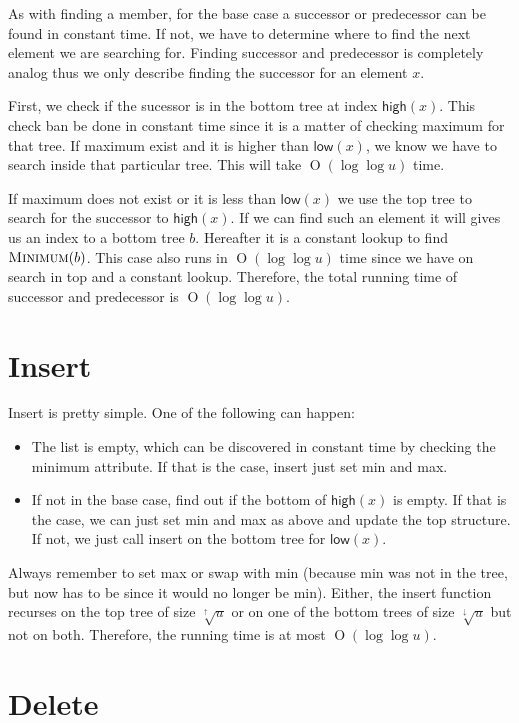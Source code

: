 \documentclass[oneside,11pt,openright]{report}
\newcommand{\BigO}[1]{\ensuremath{\operatorname{O}\left(#1\right)}}
\newcommand{\Minimum}{\textsc{Minimum}}
\newcommand{\HIGH}{\textsf{high}}
\newcommand{\LOW}{\textsf{low}}
\newcommand{\HIGHER}{\sqrt[\uparrow]{u}}
\newcommand{\LOWER}{\sqrt[\downarrow]{u}}
\begin{document}
As with finding a member, for the base case a successor or predecessor
can be found in  constant time. If not, we have  to determine where to
find  the next  element we  are searching  for. Finding  successor and
predecessor is  completely analog  thus we  only describe  finding the
successor for an element $x$.

First,  we check  if  the sucessor  is  in the  bottom  tree at  index
$\HIGH(x)$. This  check ban  be done  in constant time  since it  is a
matter of checking  maximum for that tree. If maximum  exist and it is
higher  than  $\LOW(x)$,  we  know  we  have  to  search  inside  that
particular tree. This will take $\BigO{\log\log u}$ time.

If maximum does not exist or it  is less than $\LOW(x)$ we use the top
tree to search for the successor to $\HIGH(x)$. If we can find such an
element it will gives  us an index to a bottom  tree $b$. Hereafter it
is a  constant lookup to  find $\Minimum(b)$.  This case also  runs in
$\BigO{\log\log u}$ time since we have on search in top and a constant
lookup. Therefore, the total running time of successor and predecessor
is $\BigO{\log\log u}$.

\section{Insert}

Insert is pretty simple. One of the following can happen:

\begin{itemize}
\item The list  is empty, which can be discovered  in constant time by
  checking the minimum attribute. If that is the case, insert just set
  min and max.
\item If not in the base case, find out if the bottom of $\HIGH(x)$ is
  empty. If that is the case, we can just set min and max as above and
  update the top structure. If not,  we just call insert on the bottom
  tree for $\LOW(x)$.
\end{itemize}

Always remember to  set max or swap  with min (because min  was not in
the tree, but now has to be  since it would no longer be min). Either,
the insert function  recurses on the top tree of  size $\HIGHER$ or on
one of the  bottom trees of size $\LOWER$ but  not on both. Therefore,
the running time is at most $\BigO{\log \log u}$.

\section{Delete}
\end{document}
